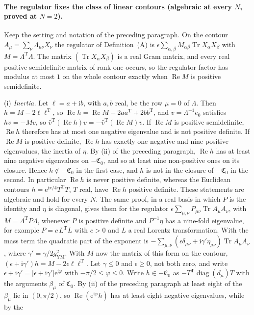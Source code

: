 \paragraph{The regulator fixes the class of linear contours (algebraic at every \(N\), proved at \(N=2\)).}
Keep the setting and notation of the preceding paragraph. On the contour \(A_\mu=\sum_\nu\Lambda_{\mu\nu}X_\nu\) the regulator of Definition~(A) is \(\epsilon\sum_{\alpha,\beta}M_{\alpha\beta}\operatorname{Tr}X_\alpha X_\beta\) with \(M=\Lambda^{\mathrm T}\Lambda\). The matrix \((\operatorname{Tr}X_\alpha X_\beta)\) is a real Gram matrix, and every real positive semidefinite matrix of rank one occurs, so the regulator factor has modulus at most \(1\) on the whole contour exactly when \(\operatorname{Re}M\) is positive semidefinite.

(i) \emph{Inertia.} Let \(\ell=a+\mathrm ib\), with \(a,b\) real, be the row \(\mu=0\) of \(\Lambda\). Then \(h=M-2\ell\ell^{\mathrm T}\), so \(\operatorname{Re}h=\operatorname{Re}M-2aa^{\mathrm T}+2bb^{\mathrm T}\), and \(v=\Lambda^{-1}e_0\) satisfies \(hv=-Mv\), so \(\bar v^{\mathrm T}(\operatorname{Re}h)v=-\bar v^{\mathrm T}(\operatorname{Re}M)v\). If \(\operatorname{Re}M\) is positive semidefinite, \(\operatorname{Re}h\) therefore has at most one negative eigenvalue and is not positive definite. If \(\operatorname{Re}M\) is positive definite, \(\operatorname{Re}h\) has exactly one negative and nine positive eigenvalues, the inertia of \(\eta\). By (ii) of the preceding paragraph, \(\operatorname{Re}h\) has at least nine negative eigenvalues on \(-\mathfrak C_0\), and so at least nine non-positive ones on its closure. Hence \(h\notin-\mathfrak C_0\) in the first case, and \(h\) is not in the closure of \(-\mathfrak C_0\) in the second. In particular \(\operatorname{Re}h\) is never positive definite, whereas the Euclidean contours \(h=\mathrm e^{\mathrm i\pi/4}T^{\mathrm T}T\), \(T\) real, have \(\operatorname{Re}h\) positive definite. These statements are algebraic and hold for every \(N\). The same proof, in a real basis in which \(P\) is the identity and \(\eta\) is diagonal, gives them for the regulator \(\epsilon\sum_{\mu,\nu}P_{\mu\nu}\operatorname{Tr}A_\mu A_\nu\), with \(M=\Lambda^{\mathrm T}P\Lambda\), whenever \(P\) is positive definite and \(P^{-1}\eta\) has a nine-fold eigenvalue, for example \(P=c\,L^{\mathrm T}L\) with \(c>0\) and \(L\) a real Lorentz transformation. With the mass term the quadratic part of the exponent is \(-\sum_{\mu,\nu}(\epsilon\delta_{\mu\nu}+\mathrm i\gamma'\eta_{\mu\nu})\operatorname{Tr}A_\mu A_\nu\), where \(\gamma'=\gamma/2g_{\mathrm{YM}}^2\). With \(M\) now the matrix of this form on the contour, \((\epsilon+\mathrm i\gamma')h=M-2\epsilon\ell\ell^{\mathrm T}\). Let \(\gamma\le0\) and \(\epsilon\ge0\), not both zero, and write \(\epsilon+\mathrm i\gamma'=|\epsilon+\mathrm i\gamma'|\mathrm e^{\mathrm i\varphi}\) with \(-\pi/2\le\varphi\le0\). Write \(h\in-\mathfrak C_0\) as \(-T^{\mathrm T}\operatorname{diag}(d_\mu)T\) with the arguments \(\beta_\mu\) of \(\mathfrak C_0\). By (ii) of the preceding paragraph at least eight of the \(\beta_\mu\) lie in \((0,\pi/2)\), so \(\operatorname{Re}(\mathrm e^{\mathrm i\varphi}h)\) has at least eight negative eigenvalues, while by the 